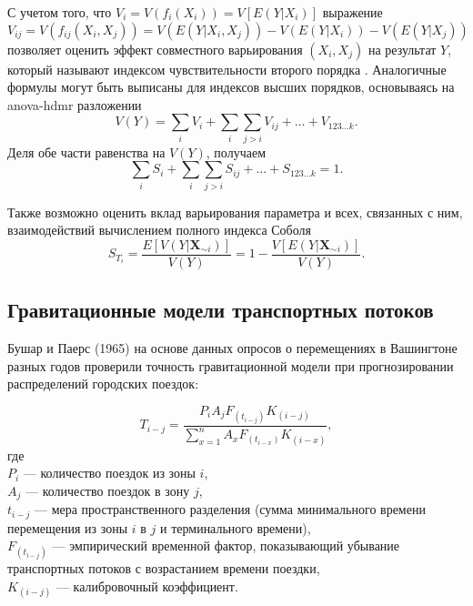 \documentclass[a4paper,12pt]{article} %
\begin{document}
С учетом того, что $V_i=V(f_i(X_i))=V[E(Y|X_i)]$ выражение
\begin{displaymath}
V_{ij}=V(f_{ij}(X_i,X_j))=V(E(Y|X_i,X_j))-V(E(Y|X_i))-V(E(Y|X_j))
\end{displaymath}
позволяет оценить эффект совместного варьирования $(X_i,X_j)$ на результат $Y$, который называют индексом чувствительности второго порядка \cite{box1978statistics}. Аналогичные формулы могут быть выписаны для индексов высших порядков, основываясь на \gls{anova-hdmr} разложении
\begin{displaymath}
V(Y)=\sum\limits_i V_i + \sum\limits_i \sum\limits_{j>i} V_{ij}+\ldots +V_{123\ldots k}.
\end{displaymath}
Деля обе части равенства на $V(Y)$, получаем
\begin{displaymath}
\sum\limits_i S_i + \sum\limits_i \sum\limits_{j>i} S_{ij}+\ldots +S_{123\ldots k}=1.
\end{displaymath}

Также возможно оценить вклад варьирования параметра и всех, связанных с ним, взаимодействий вычислением полного индекса Соболя
\begin{displaymath}
S_{T_i}=\frac{E[V(Y|\bm{X}_{\sim i})]}{V(Y)}=1-\frac{V[E(Y|\bm{X}_{\sim i})]}{V(Y)}.
\end{displaymath}
\subsection{Гравитационные модели транспортных потоков}

Бушар и Паерс (1965) \cite{bouchard1965use} на основе данных опросов о перемещениях в Вашингтоне разных годов проверили точность гравитационной модели при прогнозировании распределений городских поездок:

\begin{displaymath}
T_{i-j}=\frac{P_iA_jF_{(t_{i-j})}K_{(i-j)}}{\sum\limits_{x=1}^nA_xF_{(t_{i-x})}K_{(i-x)}},
\end{displaymath}
где \\ $P_i$ --- количество поездок из зоны $i$, \\ $A_j$ --- количество поездок в зону $j$, \\ $t_{i-j}$ --- мера пространственного разделения (сумма минимального времени перемещения из зоны $i$ в $j$ и терминального времени), \\ $F_{(t_{i-j})}$ --- эмпирический временной фактор, показывающий убывание транспортных потоков с возрастанием времени поездки, \\ $K_{(i-j)}$ --- калибровочный коэффициент.
\end{document}
